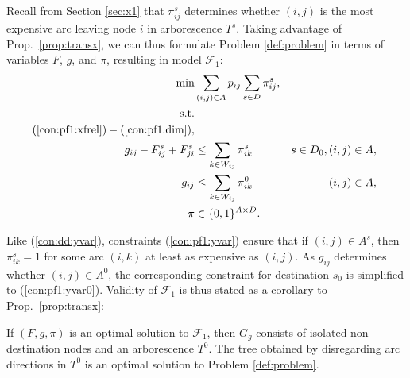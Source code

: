 Recall from Section \ref{sec:x1} that $\pi_{ij}^s$ determines whether $(i,j)$ is the most expensive arc leaving node $i$ in arborescence $T^s$.
Taking advantage of Prop.\ \ref{prop:transx}, we can thus formulate Problem \ref{def:problem} in terms of variables $F$, $g$, and $\pi$,
resulting in model $\mathcal{F}_1$:
\begin{subequations}[resume]
\begin{align}
\notag\min & \sum\limits_{(i,j) \in A} p_{ij} \sum\limits_{s \in D} \pi^s_{ij},\\ 
\notag\text{s.t.} && \\
\notag(\ref{con:pf1:xfrel}) - (\ref{con:pf1:dim}),\\
\label{con:pf1:yvar} g_{ij} - F^s_{ij}+F^s_{ji} & \leq \sum_{k\in W_{ij}}\pi^s_{ik}  & s\in D_0, (i,j)\in A,\\
\label{con:pf1:yvar0} g_{ij} & \leq \sum_{k\in W_{ij}}\pi^0_{ik}   &  (i,j)\in A,\\
\label{con:pf1:dimy} \pi&\in \{0,1\}^{A\times D}.
\end{align}~
\end{subequations}

Like (\ref{con:dd:yvar}), constraints (\ref{con:pf1:yvar}) ensure that if $(i,j)\in A^s$, then $\pi_{ik}^s=1$ for some
arc $(i,k)$ at least as expensive as $(i,j)$.
As $g_{ij}$ determines whether $(i,j)\in A^0$, the corresponding constraint for destination $s_0$ is simplified to (\ref{con:pf1:yvar0}).
Validity of $\mathcal{F}_1$ is thus stated as a corollary to Prop.\ \ref{prop:transx}:

\begin{cor}
If $(F,g,\pi)$ is an optimal solution to $\mathcal{F}_1$, then $G_g$ consists of isolated non-destination nodes and an arborescence $T^0$.
The tree obtained by disregarding arc directions in $T^0$ is an optimal solution to Problem \ref{def:problem}.
\end{cor}

